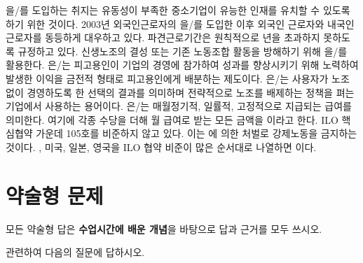 \documentclass[11pt,answers]{exam} %
\begin{document}
\begin{questions}
\question\fillin[스톡옵션]{}을/를 도입하는 취지는 유동성이 부족한 중소기업이 유능한 인재를 유치할 수 있도록 하기 위한 것이다.  
 2003년 외국인근로자의 \fillin[고용허가제]{}을/를 도입한 이후 외국인 근로자와 내국인 근로자를 동등하게 대우하고 있다. 
 파견근로기간은 원칙적으로 \fillin[1]{}년을 초과하지 못하도록 규정하고 있다. 
 신생노조의 결성 또는 기존 노동조합 활동을 방해하기 위해 \fillin[노조파괴전문가]{}을/를 활용한다.
\question\fillin[성과배분]{}은/는 피고용인이 기업의 경영에 참가하여 성과를 향상시키기 위해 노력하여 발생한 이익을 금전적 형태로 피고용인에게 배분하는 제도이다. 
\question\fillin[비노조]{}은/는 사용자가 노조 없이 경영하도록 한 선택의 결과를 의미하며 전략적으로 노조를 배제하는 정책을 펴는 기업에서 사용하는 용어이다. 
\question\fillin[통상임금]{}은/는 매월정기적, 일률적, 고정적으로 지급되는 급여를 의미한다. 여기에 각종 수당을 더해 월 급여로 받는 모든 금액을 \fillin[평균임금]{}이라고 한다.
 ILO 핵심협약 가운데 105호를 비준하지 않고 있다. 이는 에 의한 처벌로 강제노동을 금지하는 것이다.
, 미국, 일본, 영국을 ILO 협약 비준이 많은 순서대로 나열하면 \fillin[영국, 일본, 한국, 미국]{} 이다. 
\pagebreak

\section*{약술형 문제}
모든 약술형 답은 \textbf{수업시간에 배운 개념}을 바탕으로 답과 근거를 모두 쓰시오.

 관련하여 다음의 질문에 답하시오.
\end{questions}
\end{document}
